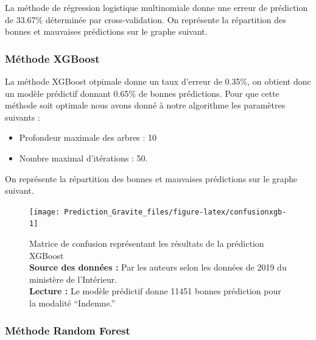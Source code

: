 \documentclass[french,]{tp}
\providecommand{\tightlist}{%
  \setlength{\itemsep}{0pt}\setlength{\parskip}{0pt}}
\begin{document}
La méthode de régression logistique multinomiale donne une erreur de prédiction de 33.67\% déterminée par cross-validation.
On représente la répartition des bonnes et mauvaises prédictions sur le graphe suivant.





\newpage

\hypertarget{xgboost}{%
\subsubsection{Méthode XGBoost}\label{xgboost}}

La méthode XGBoost otpimale donne un taux d'erreur de 0.35\%, on obtient donc un modèle prédictif donnant 0.65\% de bonnes prédictions. Pour que cette méthode soit optimale nous avons donné à notre algorithme les paramètres suivants :

\begin{itemize}
\tightlist
\item
  Profondeur maximale des arbres : 10\\
\item
  Nombre maximal d'itérations : 50.
\end{itemize}

On représente la répartition des bonnes et mauvaises prédictions sur le graphe suivant.

\begin{figure}[ht!]

{\centering \texttt{[image: Prediction\_Gravite\_files/figure-latex/confusionxgb-1]} 

}

\caption{Matrice de confusion représentant les résultats de la prédiction XGBoost\\
\textbf{Source des données :} Par les auteurs selon les données de 2019 du ministère de l'Intérieur.\\
\textbf{Lecture :} Le modèle prédictif donne 11451 bonnes prédiction pour la modalité ``Indemne.''}\label{fig:confusionxgb}
\end{figure}





\newpage

\hypertarget{random-forest}{%
\subsubsection{Méthode Random Forest}\label{random-forest}}
\end{document}
